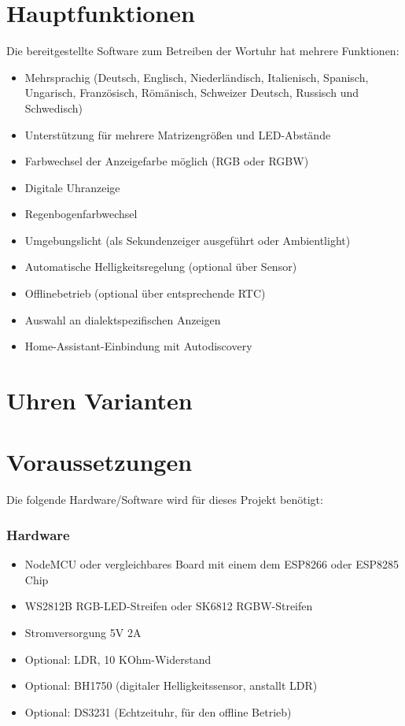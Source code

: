 \documentclass[12pt,a4paper, german,oneside, headinclude, headsepline,plainheadsepline,BCOR20mm, DIV18,parskip=half, openright, numbers=noenddot, captions=tableheading,version=first,listof=totoc,version=first]{scrbook}
\begin{document}
\section{Hauptfunktionen}

Die bereitgestellte Software zum Betreiben der Wortuhr hat mehrere Funktionen:

\begin{itemize}
    \item Mehrsprachig (Deutsch, Englisch, Niederländisch, Italienisch, Spanisch, Ungarisch, Französisch, Römänisch, Schweizer Deutsch, Russisch und Schwedisch)
    \item Unterstützung für mehrere Matrizengrößen und LED-Abstände
    \item Farbwechsel der Anzeigefarbe möglich (RGB oder RGBW)
    \item Digitale Uhranzeige
    \item Regenbogenfarbwechsel
    \item Umgebungslicht (als Sekundenzeiger ausgeführt oder Ambientlight)
    \item Automatische Helligkeitsregelung (optional über Sensor)
    \item Offlinebetrieb (optional über entsprechende RTC)
    \item Auswahl an dialektspezifischen Anzeigen
    \item Home-Assistant-Einbindung mit Autodiscovery
\end{itemize}

\section{Uhren Varianten}

\section{Voraussetzungen}

Die folgende Hardware/Software wird für dieses Projekt benötigt:

\subsubsection{Hardware}

\begin{itemize}
    \item NodeMCU oder vergleichbares Board mit einem dem ESP8266 oder ESP8285 Chip
    \item WS2812B RGB-LED-Streifen oder SK6812 RGBW-Streifen
    \item Stromversorgung 5V 2A
    \item Optional: LDR, 10 KOhm-Widerstand
    \item Optional: BH1750 (digitaler Helligkeitssensor, anstallt LDR)
    \item Optional: DS3231 (Echtzeituhr, für den offline Betrieb)
\end{itemize}
\end{document}
